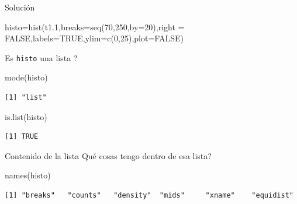 \documentclass[
  ignorenonframetext,
  aspectratio=169,
  spanish,
]{beamer}
\newenvironment{Shaded}{\begin{snugshade}}{\end{snugshade}}
\newcommand{\AttributeTok}[1]{\textcolor[rgb]{0.40,0.45,0.13}{#1}}
\newcommand{\ConstantTok}[1]{\textcolor[rgb]{0.56,0.35,0.01}{#1}}
\newcommand{\DecValTok}[1]{\textcolor[rgb]{0.68,0.00,0.00}{#1}}
\newcommand{\FloatTok}[1]{\textcolor[rgb]{0.68,0.00,0.00}{#1}}
\newcommand{\FunctionTok}[1]{\textcolor[rgb]{0.28,0.35,0.67}{#1}}
\newcommand{\NormalTok}[1]{\textcolor[rgb]{0.00,0.23,0.31}{#1}}
\newcommand{\OtherTok}[1]{\textcolor[rgb]{0.00,0.23,0.31}{#1}}
\begin{document}
\begin{frame}[fragile]{Solución}
\label{soluciuxf3n}
\begin{Shaded}
\begin{Highlighting}[]
\NormalTok{histo}\OtherTok{=}\FunctionTok{hist}\NormalTok{(t1}\FloatTok{.1}\NormalTok{,}\AttributeTok{breaks=}\FunctionTok{seq}\NormalTok{(}\DecValTok{70}\NormalTok{,}\DecValTok{250}\NormalTok{,}\AttributeTok{by=}\DecValTok{20}\NormalTok{),}\AttributeTok{right =} \ConstantTok{FALSE}\NormalTok{,}\AttributeTok{labels=}\ConstantTok{TRUE}\NormalTok{,}\AttributeTok{ylim=}\FunctionTok{c}\NormalTok{(}\DecValTok{0}\NormalTok{,}\DecValTok{25}\NormalTok{),}\AttributeTok{plot=}\ConstantTok{FALSE}\NormalTok{)   }
\end{Highlighting}
\end{Shaded}

Es \texttt{histo} una lista ?

\begin{Shaded}
\begin{Highlighting}[]
\FunctionTok{mode}\NormalTok{(histo)}
\end{Highlighting}
\end{Shaded}

\begin{verbatim}
[1] "list"
\end{verbatim}

\begin{Shaded}
\begin{Highlighting}[]
\FunctionTok{is.list}\NormalTok{(histo) }
\end{Highlighting}
\end{Shaded}

\begin{verbatim}
[1] TRUE
\end{verbatim}
\end{frame}

\begin{frame}[fragile]{Contenido de la lista}
\label{contenido-de-la-lista}
Qué cosas tengo dentro de esa lista?

\begin{Shaded}
\begin{Highlighting}[]
\FunctionTok{names}\NormalTok{(histo)}
\end{Highlighting}
\end{Shaded}

\begin{verbatim}
[1] "breaks"   "counts"   "density"  "mids"     "xname"    "equidist"
\end{verbatim}
\end{frame}
\end{document}
